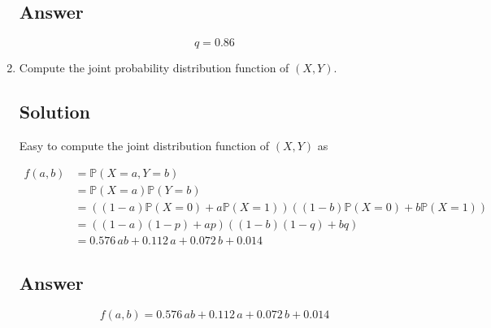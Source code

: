 \documentclass[12pt]{article}
\newcommand{\bP}{\mathbb{P}}
\begin{document}
\begin{enumerate}[start=1,label={\bfseries Part \arabic*:},leftmargin=0in]
		\subsection*{Answer}
		
			\[\boxed{q = 0.86}\]
			
		\bigskip\item Compute the joint probability distribution function of $(X,Y)$.
		
		\subsection*{Solution}
		
			Easy to compute the joint distribution function of $(X,Y)$ as
		
			\[
			\begin{aligned}
				f(a,b) &= \bP(X=a,Y=b)\\
				&= \bP(X=a)\bP(Y=b)\\
				&= ((1-a)\bP(X=0) + a\bP(X=1))((1-b)\bP(X=0) + b\bP(X=1))\\
				&= ((1-a)(1-p) + ap)((1-b)(1-q) + bq)\\
				&= 0.576\,ab + 0.112\,a + 0.072\,b + 0.014
			\end{aligned}
			\]
		
		\subsection*{Answer}
		
			\[\boxed{f(a,b) = 0.576\,ab + 0.112\,a + 0.072\,b + 0.014}\]
	\end{enumerate}
	
\end{document}
